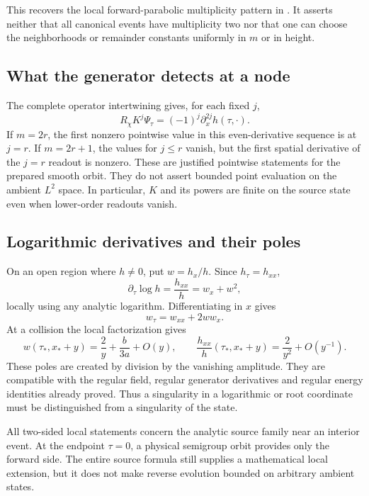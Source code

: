 This recovers the local forward-parabolic multiplicity pattern in
\cite{Angenent1991,HeatMultiplicity}. It asserts neither that all
canonical events have multiplicity two nor that one can choose the neighborhoods
or remainder constants uniformly in \(m\) or in height.

\subsection{What the generator detects at a node}
The complete operator intertwining gives, for each fixed \(j\),
\begin{equation}\label{eq:generator-jets}
 R_\chi K^j\Psi_\tau=(-1)^j\partial_x^{2j}h(\tau,\cdot).
\end{equation}
If \(m=2r\), the first nonzero pointwise value in this even-derivative
sequence is at \(j=r\). If \(m=2r+1\), the values for \(j\leq r\)
vanish, but the first spatial derivative of the \(j=r\) readout is
nonzero. These are justified pointwise statements for the prepared
smooth orbit. They do not assert bounded point evaluation on the
ambient \(L^2\) space. In particular, \(K\) and its powers are finite
on the source state even when lower-order readouts vanish.

\subsection{Logarithmic derivatives and their poles}
On an open region where \(h\ne0\), put \(w=h_x/h\).
Since \(h_\tau=h_{xx}\),
\[
 \partial_\tau\log h=\frac{h_{xx}}h=w_x+w^2,
\]
locally using any analytic logarithm. Differentiating in \(x\) gives
\begin{equation}\label{eq:burgers}
 w_\tau=w_{xx}+2ww_x.
\end{equation}
At a collision the local factorization gives
\[
 w(\tau_*,x_*+y)=\frac2y+\frac{b}{3a}+O(y),\qquad
 \frac{h_{xx}}h(\tau_*,x_*+y)=\frac2{y^2}+O(y^{-1}).
\]
These poles are created by division by the vanishing amplitude.
They are compatible with the regular field, regular generator
derivatives and regular energy identities already proved. Thus a
singularity in a logarithmic or root coordinate must be distinguished
from a singularity of the state.

All two-sided local statements concern the analytic source family
near an interior event. At the endpoint \(\tau=0\), a physical
semigroup orbit provides only the forward side. The entire source
formula still supplies a mathematical local extension, but it does
not make reverse evolution bounded on arbitrary ambient states.
